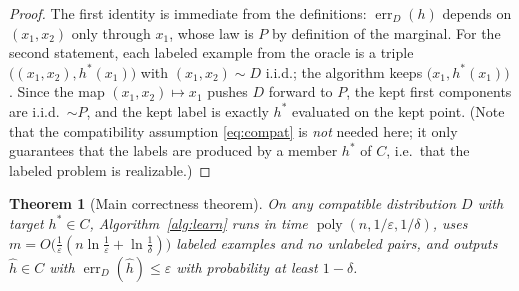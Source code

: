 \documentclass{amsart}
\newtheorem{theorem}{Theorem}
\theoremstyle{definition}
\theoremstyle{remark}
\newcommand{\eps}{\varepsilon}
\DeclareMathOperator*{\err}{err}
\DeclareMathOperator{\poly}{poly}
\begin{document}
\begin{proof}
The first identity is immediate from the definitions: $\err_D(h)$ depends on
$(x_1,x_2)$ only through $x_1$, whose law is $P$ by definition of the marginal.
For the second statement, each labeled example from the oracle is a triple
$\big((x_1,x_2),h^*(x_1)\big)$ with $(x_1,x_2)\sim D$ i.i.d.; the algorithm
keeps $\big(x_1,h^*(x_1)\big)$. Since the map $(x_1,x_2)\mapsto x_1$ pushes $D$
forward to $P$, the kept first components are i.i.d.\ $\sim P$, and the kept
label is exactly $h^*$ evaluated on the kept point. (Note that the
compatibility assumption \eqref{eq:compat} is \emph{not} needed here; it only
guarantees that the labels are produced by a member $h^*$ of $C$, i.e.\ that the
labeled problem is realizable.)
\end{proof}

\begin{theorem}[Main correctness theorem]\label{thm:main}
On any compatible distribution $D$ with target $h^*\in C$, Algorithm~\ref{alg:learn}
runs in time $\poly(n,1/\eps,1/\delta)$, uses
$m=O\big(\tfrac1\eps(n\ln\tfrac1\eps+\ln\tfrac1\delta)\big)$ labeled examples and
no unlabeled pairs, and outputs $\hat h\in C$ with $\err_D(\hat h)\le\eps$ with
probability at least $1-\delta$.
\end{theorem}
\end{document}
